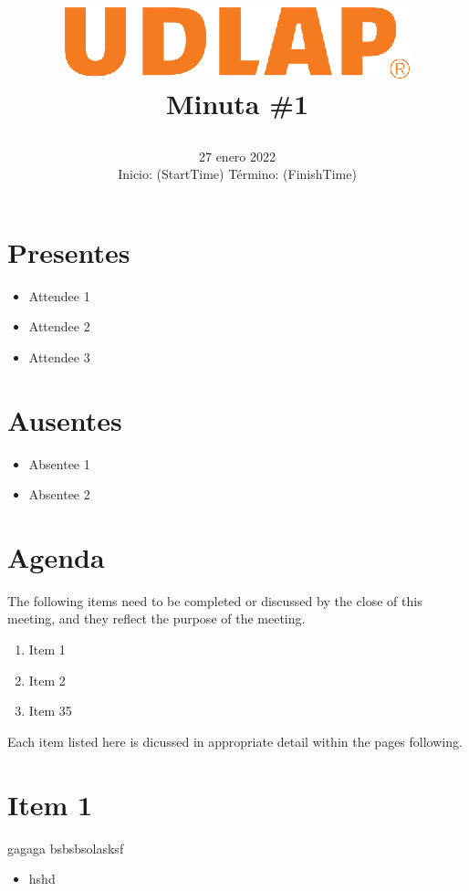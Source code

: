 \documentclass[12pt, a4paper]{article}
\title{
	\includegraphics[width=10cm]{udlap.eps}\vspace{2ex} 
	\\ 
	\titlefont Minuta \#1\vspace{-3ex}
	\author{} %
}
\date{
\huge 27 enero 2022 \\ \vspace{0.5ex}
\large Inicio: (StartTime) \quad Término: (FinishTime)}
\begin{document}
\maketitle %
\begin{minipage}[t]{0.4\textwidth}
\section*{Presentes}
\begin{itemize}
\item Attendee 1
\item Attendee 2
\item Attendee 3
\end{itemize}
\end{minipage}
\begin{minipage}[t]{0.5\textwidth}
\section*{Ausentes}
\begin{itemize}
\item Absentee 1
\item Absentee 2
\end{itemize}
\end{minipage}

\section*{Agenda}
The following items need to be completed or discussed by the close of this meeting, and they reflect the purpose of the meeting.
\begin{enumerate}
\item Item 1
\item Item 2
\item Item 35
\end{enumerate}
Each item listed here is dicussed in appropriate detail within the pages following.
\section{Item 1}
gagaga bsbsbsolasksf
\begin{itemize}
	\item hshd
\end{itemize}
\end{document}
